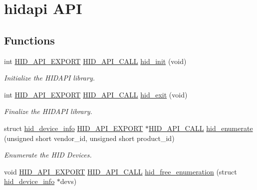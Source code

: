 \hypertarget{group___a_p_i}{\section{hidapi \-A\-P\-I}
\label{group___a_p_i}
}
\subsection*{\-Functions}
\begin{DoxyCompactItemize}
\item 
int \hyperlink{hidapi_8h_aa60150016800ccb88fdf140e8553ae13}{\-H\-I\-D\-\_\-\-A\-P\-I\-\_\-\-E\-X\-P\-O\-R\-T} \hyperlink{hidapi_8h_af140a25716604e86096670a505a58ee0}{\-H\-I\-D\-\_\-\-A\-P\-I\-\_\-\-C\-A\-L\-L} \hyperlink{group___a_p_i_ga142ffc1b0b7a7fa412d3862b2a17164b}{hid\-\_\-init} (void)
\begin{DoxyCompactList}\small\item\em \-Initialize the \-H\-I\-D\-A\-P\-I library. \end{DoxyCompactList}\item 
int \hyperlink{hidapi_8h_aa60150016800ccb88fdf140e8553ae13}{\-H\-I\-D\-\_\-\-A\-P\-I\-\_\-\-E\-X\-P\-O\-R\-T} \hyperlink{hidapi_8h_af140a25716604e86096670a505a58ee0}{\-H\-I\-D\-\_\-\-A\-P\-I\-\_\-\-C\-A\-L\-L} \hyperlink{group___a_p_i_gacf5da9ce37132eba69fc259f17f13023}{hid\-\_\-exit} (void)
\begin{DoxyCompactList}\small\item\em \-Finalize the \-H\-I\-D\-A\-P\-I library. \end{DoxyCompactList}\item 
struct \hyperlink{structhid__device__info}{hid\-\_\-device\-\_\-info} \*
\hyperlink{hidapi_8h_aa60150016800ccb88fdf140e8553ae13}{\-H\-I\-D\-\_\-\-A\-P\-I\-\_\-\-E\-X\-P\-O\-R\-T} $\ast$\hyperlink{hidapi_8h_af140a25716604e86096670a505a58ee0}{\-H\-I\-D\-\_\-\-A\-P\-I\-\_\-\-C\-A\-L\-L} \hyperlink{group___a_p_i_ga135931e04d48078a9fb7aebf663676f9}{hid\-\_\-enumerate} (unsigned short vendor\-\_\-id, unsigned short product\-\_\-id)
\begin{DoxyCompactList}\small\item\em \-Enumerate the \-H\-I\-D \-Devices. \end{DoxyCompactList}\item 
void \hyperlink{hidapi_8h_aa60150016800ccb88fdf140e8553ae13}{\-H\-I\-D\-\_\-\-A\-P\-I\-\_\-\-E\-X\-P\-O\-R\-T} \hyperlink{hidapi_8h_af140a25716604e86096670a505a58ee0}{\-H\-I\-D\-\_\-\-A\-P\-I\-\_\-\-C\-A\-L\-L} \hyperlink{group___a_p_i_gafc2d2adf71db3784b783b9a554527aa4}{hid\-\_\-free\-\_\-enumeration} (struct \hyperlink{structhid__device__info}{hid\-\_\-device\-\_\-info} $\ast$devs)

\end{DoxyCompactItemize}
